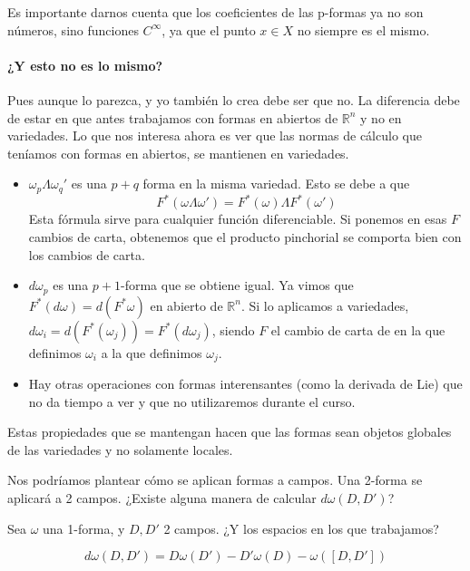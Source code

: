 Es importante darnos cuenta que los coeficientes de las p-formas ya no son números, sino funciones $C^∞$, ya que el punto $x∈X$ no siempre es el mismo.

\paragraph{¿Y esto no es lo mismo?} Pues aunque lo parezca, y yo también lo crea debe ser que no. La diferencia debe de estar en que antes trabajamos con formas en abiertos de $ℝ^n$ y no en variedades. Lo que nos interesa ahora es ver que las normas de cálculo que teníamos con formas en abiertos, se mantienen en variedades.

\begin{itemize}
\item $ω_pΛω_q'$ es una $p+q$ forma en la misma variedad. Esto se debe a que \[F^*(ωΛω') = F^*(ω) Λ F^*(ω')\]
Esta fórmula sirve para cualquier función diferenciable. Si ponemos en esas $F$ cambios de carta, obtenemos que el producto pinchorial se comporta bien con los cambios de carta.

\item $dω_p$ es una $p+1$-forma que se obtiene igual. Ya vimos que $F^*(dω) = d(F^*ω)$ en abierto de $ℝ^n$. Si lo aplicamos a variedades, $dω_i = d(F^*(ω_j)) = F^*(dω_j)$, siendo $F$ el cambio de carta de en la que definimos $ω_i$ a la que definimos $ω_j$.
\item Hay otras operaciones con formas interensantes (como la derivada de Lie) que no da tiempo a ver y que no utilizaremos durante el curso.
\end{itemize}

Estas propiedades que se mantengan hacen que las formas sean objetos globales de las variedades y no solamente locales.

Nos podríamos plantear cómo se aplican formas a campos. Una 2-forma se aplicará a 2 campos. ¿Existe alguna manera de calcular $dω(D,D')$?

\begin{theorem}
Sea $ω$ una 1-forma, y $D,D'$ 2 campos. ¿Y los espacios en los que trabajamos?

\[dω(D,D') = Dω(D') - D'ω(D) - ω([D,D'])\]

\end{theorem}


